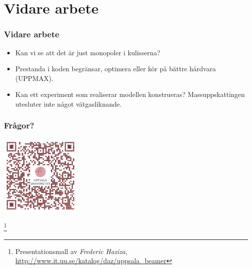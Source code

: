 \documentclass[aspectratio=169]{beamer}
\newcommand\blfootnote[1]{%
\begingroup
\renewcommand\thefootnote{}\footnote{#1}%
\addtocounter{footnote}{-1}%
\endgroup
}
\begin{document}
\section{Vidare arbete}
\begin{frame}
        \frametitle{Vidare arbete}
        \begin{itemize}
                \item  Kan vi se att det är just
                        monopoler i kulisserna?
                \item Prestanda i koden begränsar,
                        optimera eller kör på bättre
                        hårdvara (UPPMAX).
                \item Kan ett experiment som realiserar
                        modellen konstrueras?
                        Massuppskattingen utesluter inte
                        något vätgasliknande.
        \end{itemize}
\end{frame}
\begin{frame}
        \frametitle{Frågor?}
        \begin{center}
        \includegraphics[width=0.3\textwidth]{qr-code}
        \end{center}
\blfootnote{Presentationsmall av \textit{Frederic Haziza},
        \url{http://www.it.uu.se/katalog/daz/uppsala_beamer}}
\end{frame}
\end{document}
